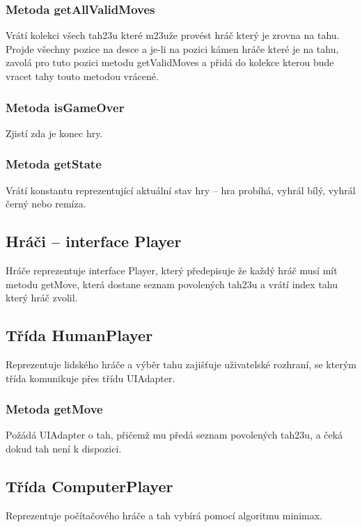 \documentclass{article}
\begin{document}
\subsubsection{Metoda getAllValidMoves}
Vr\'at\'i kolekci v\v{s}ech tah\accent23u kter\'e m\accent23u\v{z}e prov\'est hr\'a\v{c} kter\'y je zrovna na tahu. Projde v\v{s}echny pozice na desce a je-li na pozici k\'amen hr\'a\v{c}e kter\'e je na tahu, zavol\'a pro tuto pozici metodu getValidMoves a p\v{r}id\'a do kolekce kterou bude vracet tahy touto metodou vr\'acen\'e.

\subsubsection{Metoda isGameOver}
Zjist\'i zda je konec hry.

\subsubsection{Metoda getState}
Vr\'at\'i konstantu reprezentuj\'ic\'i aktu\'aln\'i stav hry – hra prob\'ih\'a, vyhr\'al b\'il\'y, vyhr\'al \v{c}ern\'y nebo rem\'iza.



\subsection{Hr\'a\v{c}i – interface Player}
Hr\'a\v{c}e reprezentuje interface Player, kter\'y p\v{r}edepisuje \v{z}e ka\v{z}d\'y hr\'a\v{c} mus\'i m\'it metodu getMove, kter\'a dostane seznam povolen\'ych tah\accent23u a vr\'at\'i index tahu kter\'y hr\'a\v{c} zvolil.


\subsection{T\v{r}\'ida HumanPlayer}
Reprezentuje lidsk\'eho hr\'a\v{c}e a v\'yb\v{e}r tahu zaji\v{s}\v{t}uje u\v{z}ivatelsk\'e rozhran\'i, se kter\'ym t\v{r}\'ida komunikuje p\v{r}es t\v{r}\'idu UIAdapter.

\subsubsection{Metoda getMove}
Po\v{z}\'ad\'a UIAdapter o tah, p\v{r}i\v{c}em\v{z} mu p\v{r}ed\'a seznam povolen\'ych tah\accent23u, a \v{c}ek\'a dokud tah nen\'i k dispozici.

\subsection{T\v{r}\'ida ComputerPlayer}
Reprezentuje po\v{c}\'ita\v{c}ov\'eho hr\'a\v{c}e a tah vyb\'ir\'a pomoc\'i algoritmu minimax.
\end{document}
